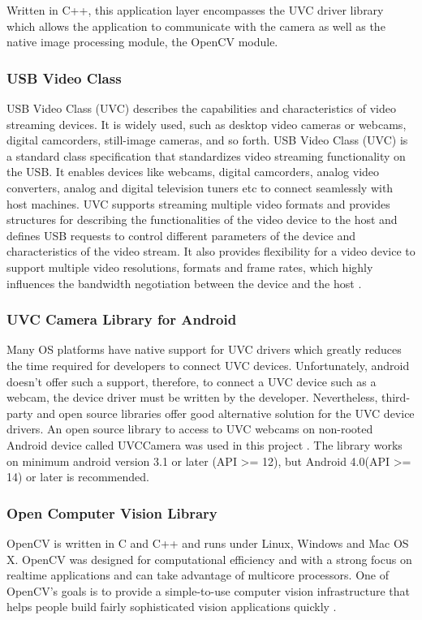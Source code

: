 Written in C++, this application layer encompasses the UVC driver library which allows the application to communicate with the camera as well as the native image processing module, the OpenCV module.

\subsubsection{USB Video Class}

USB Video Class (UVC) describes the capabilities and characteristics of video streaming devices. It is widely used, such as desktop video cameras or webcams, digital camcorders, still-image cameras, and so forth. USB Video Class (UVC) is a standard class specification that standardizes video streaming functionality on the USB. It enables devices like webcams, digital camcorders, analog video converters, analog and digital television tuners etc to connect seamlessly with host machines. UVC supports streaming multiple video formats and provides structures for describing the functionalities of the video device to the host and defines USB requests to control different parameters of the device and characteristics of the video stream. It also provides flexibility for a video device to support multiple video resolutions, formats and frame rates, which highly influences the bandwidth negotiation between the device and the host \parencite{uvc}.

\subsubsection{UVC Camera Library for Android}
Many OS platforms have native support for UVC drivers which greatly reduces the time required for developers to connect UVC devices. Unfortunately, android doesn’t offer such a support, therefore, to connect a UVC device such as a webcam, the device driver must be written by the developer. 
Nevertheless, third-party and open source libraries offer good alternative solution for the UVC device drivers. An open source library to access to UVC webcams on non-rooted Android device called UVCCamera was used in this project \parencite{uvcCamera}. The library works on minimum android version 3.1 or later (API >= 12), but Android 4.0(API >= 14) or later is recommended.


\subsubsection{Open Computer Vision Library}
OpenCV is written in C and C++ and runs under Linux, Windows and Mac OS X. OpenCV was designed for computational efficiency and with a strong focus on realtime applications and can take advantage of multicore processors. One of OpenCV’s goals is to provide a simple-to-use computer vision infrastructure that helps people build fairly sophisticated vision applications quickly \parencite{openCv}.

